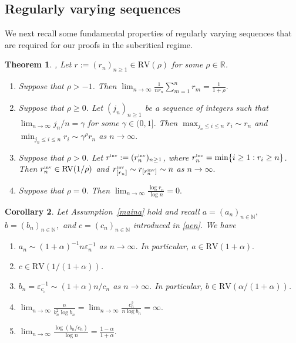 \documentclass[12pt]{amsart}
\newtheorem{theorem}{Theorem} \makeatletter
\newtheorem{corollary}[theorem]{Corollary}
\begin{document}
\subsection{Regularly varying sequences}
\label{vary}
We next recall some fundamental properties of regularly varying
sequences that are required for our proofs in the subcritical
regime.
\begin{theorem}
\label{th:rv} \cite{rvbook}, \cite{rvs} Let $r:=(r_n)_{n\ge 1}\in
\mbox{RV}(\rho)$ for some $\rho \in {{\mathbb R}} $.
\begin{enumerate}
\item  Suppose that  $\rho > -1$. Then
$\lim_{n\to\infty} {\frac {\displaystyle {1}}{\displaystyle {nr_n} }}\sum_{m=1}^n r_m={\frac {\displaystyle {1}}{\displaystyle {1+\rho} }}.$
\item Suppose that $\rho\ge 0$.  Let $(j_n)_{n\ge 1}$ be a sequence of integers such that
$\lim_{n\to\infty} j_n / n = \gamma$ for some $\gamma\in (0,1].$
Then $\max_{j_n\le i \le n } r_i \sim r_n$ and $\min_{ j_n \le i \le
n} r_i \sim \gamma^{\rho} r_n$ as $n\to\infty.$
\item
Suppose that $\rho >0$. Let $r^{\mbox{\rm \tiny inv}}:=(r^{\mbox{\rm
\tiny inv}}_n)_{n\ge 1}$, where $r^{\mbox{\rm \tiny inv}}_n =
\min\{i\ge 1:r_i \geq n\}$. Then $ r^{\mbox{\rm \tiny inv}}_n \in
\mbox{RV}(1/\rho)$ and $r^{\mbox{\rm \tiny inv}}_{[r_n]} \sim
r_{[r^{\mbox{\rm \tiny inv}}_n]}\sim n$ as $n\to\infty.$
\item Suppose that $\rho=0.$ Then $\lim_{n\to\infty} {\frac {\displaystyle {\log r_n}}{\displaystyle {\log n} }}=0.$
\end{enumerate}
\end{theorem}
\begin{corollary}
\label{sequen} Let Assumption~\ref{maina} hold and 
recall $a=(a_n)_{n\in{{\mathbb N}}},$ $b=(b_n)_{n\in{{\mathbb N}}},$ and $c=(c_n)_{n\in{{\mathbb N}}}$ introduced in \eqref{aen}. We have
\begin{enumerate}
\item   $a_n\sim (1+\alpha)^{-1}n{\varepsilon}_n^{-1}$ as $n\to\infty.$
In particular, $a\in \mbox{RV}(1+\alpha).$
\item $c\in \mbox{RV}(1/(1+\alpha))$.
\item $b_n={\varepsilon}_{c_{_{n}}}^{-1}\sim (1+\alpha) n/c_n$ as $n\to\infty.$
In particular, $b\in \mbox{RV}(\alpha/(1+\alpha))$.
\item $\displaystyle \lim_{n \to \infty}
\frac{n}{b_n^2\log b_n} =\lim_{n\to\infty} {\frac {\displaystyle {c_n^2}}{\displaystyle {n\log
b_n} }}=\infty.$
\item $\lim_{n\to\infty} {\frac {\displaystyle {\log(b_n/c_n)}}{\displaystyle {\log n} }}=
{\frac {\displaystyle {1-\alpha}}{\displaystyle {1+\alpha} }} .$
\end{enumerate}
\end{corollary}
\end{document}

